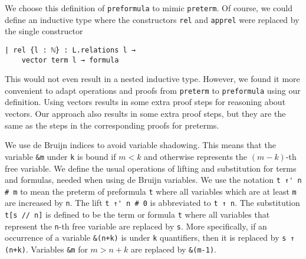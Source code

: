 \documentclass[sigplan,10pt,review, anonymous]{acmart}
\newcommand{\lil}{\lstinline}
\theoremstyle{definition}
\begin{document}
We choose this definition of \lil{preformula} to mimic \lil{preterm}.
Of course, we could define an inductive type where the constructors \lil{rel} and \lil{apprel} were replaced by the single constructor
\begin{lstlisting}
| rel {l : ℕ} : L.relations l →
    vector term l → formula
\end{lstlisting}
This would not even result in a nested inductive type.
However, we found it more convenient to adapt operations and proofs from \lil{preterm} to \lil{preformula} using our definition.
Using vectors results in some extra proof steps for reasoning about vectors.
Our approach also results in some extra proof steps, but they are the same as the steps in the corresponding proofs for preterms.

We use de Bruijn indices to avoid variable shadowing. This means that the variable \lil{&m} under \lil{k} is bound if $m<k$ and otherwise represents the $(m-k)$-th free variable.
We define the usual operations of lifting and substitution for terms and formulas, needed when using de Bruijn variables.
We use the notation \lil{t ↑' n # m} to mean the preterm of preformula \lil{t} where all variables which are at least \lil{m} are increased by \lil{n}.
The lift \lil{t ↑' n # 0} is abbreviated to \lil{t ↑ n}.
The substitution \lil{t[s // n]} is defined to be the term or formula \lil{t} where all variables that represent the \lil{n}-th free variable are replaced by \lil{s}.
More specifically, if an occurrence of a variable \lil{&(n+k)} is under \lil{k} quantifiers, then it is replaced by \lil{s ↑ (n+k)}.
Variables \lil{&m} for $m>n+k$ are replaced by \lil{&(m-1)}.
\end{document}
